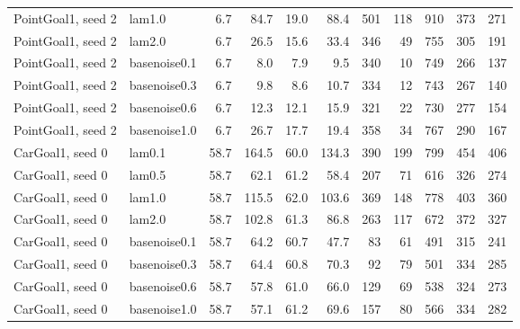 \begin{tabular}{llrrrrrrrrr}
PointGoal1, seed 2 & lam1.0 & 6.7 & 84.7 & 19.0 & 88.4 & 501 & 118 & 910 & 373 & 271 \\
PointGoal1, seed 2 & lam2.0 & 6.7 & 26.5 & 15.6 & 33.4 & 346 & 49 & 755 & 305 & 191 \\
PointGoal1, seed 2 & basenoise0.1 & 6.7 & 8.0 & 7.9 & 9.5 & 340 & 10 & 749 & 266 & 137 \\
PointGoal1, seed 2 & basenoise0.3 & 6.7 & 9.8 & 8.6 & 10.7 & 334 & 12 & 743 & 267 & 140 \\
PointGoal1, seed 2 & basenoise0.6 & 6.7 & 12.3 & 12.1 & 15.9 & 321 & 22 & 730 & 277 & 154 \\
PointGoal1, seed 2 & basenoise1.0 & 6.7 & 26.7 & 17.7 & 19.4 & 358 & 34 & 767 & 290 & 167 \\
\midrule
CarGoal1, seed 0 & lam0.1 & 58.7 & 164.5 & 60.0 & 134.3 & 390 & 199 & 799 & 454 & 406 \\
CarGoal1, seed 0 & lam0.5 & 58.7 & 62.1 & 61.2 & 58.4 & 207 & 71 & 616 & 326 & 274 \\
CarGoal1, seed 0 & lam1.0 & 58.7 & 115.5 & 62.0 & 103.6 & 369 & 148 & 778 & 403 & 360 \\
CarGoal1, seed 0 & lam2.0 & 58.7 & 102.8 & 61.3 & 86.8 & 263 & 117 & 672 & 372 & 327 \\
CarGoal1, seed 0 & basenoise0.1 & 58.7 & 64.2 & 60.7 & 47.7 & 83 & 61 & 491 & 315 & 241 \\
CarGoal1, seed 0 & basenoise0.3 & 58.7 & 64.4 & 60.8 & 70.3 & 92 & 79 & 501 & 334 & 285 \\
CarGoal1, seed 0 & basenoise0.6 & 58.7 & 57.8 & 61.0 & 66.0 & 129 & 69 & 538 & 324 & 273 \\
CarGoal1, seed 0 & basenoise1.0 & 58.7 & 57.1 & 61.2 & 69.6 & 157 & 80 & 566 & 334 & 282 \\
\bottomrule
\end{tabular}